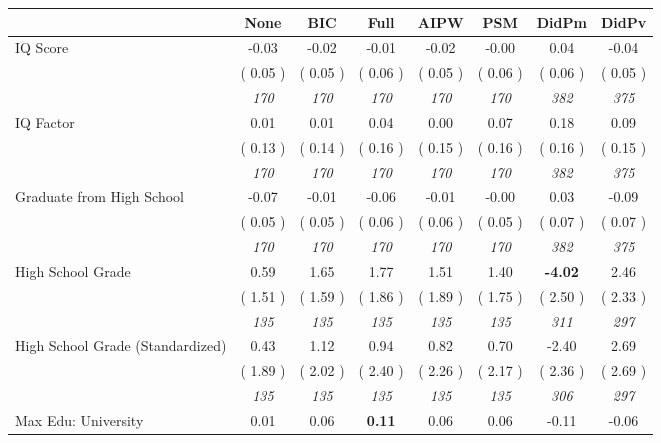 \begin{tabular}{l c c c c c c c}
\toprule
 & None & BIC & Full & AIPW & PSM & DidPm & DidPv \\
\midrule
IQ Score &     -0.03 &     -0.02 &     -0.01 &     -0.02 &     -0.00 &      0.04 &     -0.04 \\
& (     0.05 ) & (     0.05 ) & (     0.06 ) & (     0.05 ) & (     0.06 ) & (     0.06 ) & (     0.05 ) \\
& \textit{ 170 } & \textit{ 170 } & \textit{ 170 } & \textit{ 170 } & \textit{ 170 } & \textit{ 382 } & \textit{ 375 } \\
IQ Factor &      0.01 &      0.01 &      0.04 &      0.00 &      0.07 &      0.18 &      0.09 \\
& (     0.13 ) & (     0.14 ) & (     0.16 ) & (     0.15 ) & (     0.16 ) & (     0.16 ) & (     0.15 ) \\
& \textit{ 170 } & \textit{ 170 } & \textit{ 170 } & \textit{ 170 } & \textit{ 170 } & \textit{ 382 } & \textit{ 375 } \\
Graduate from High School &     -0.07 &     -0.01 &     -0.06 &     -0.01 &     -0.00 &      0.03 &     -0.09 \\
& (     0.05 ) & (     0.05 ) & (     0.06 ) & (     0.06 ) & (     0.05 ) & (     0.07 ) & (     0.07 ) \\
& \textit{ 170 } & \textit{ 170 } & \textit{ 170 } & \textit{ 170 } & \textit{ 170 } & \textit{ 382 } & \textit{ 375 } \\
High School Grade &      0.59 &      1.65 &      1.77 &      1.51 &      1.40 & \textbf{     -4.02 } &      2.46 \\
& (     1.51 ) & (     1.59 ) & (     1.86 ) & (     1.89 ) & (     1.75 ) & (     2.50 ) & (     2.33 ) \\
& \textit{ 135 } & \textit{ 135 } & \textit{ 135 } & \textit{ 135 } & \textit{ 135 } & \textit{ 311 } & \textit{ 297 } \\
High School Grade (Standardized) &      0.43 &      1.12 &      0.94 &      0.82 &      0.70 &     -2.40 &      2.69 \\
& (     1.89 ) & (     2.02 ) & (     2.40 ) & (     2.26 ) & (     2.17 ) & (     2.36 ) & (     2.69 ) \\
& \textit{ 135 } & \textit{ 135 } & \textit{ 135 } & \textit{ 135 } & \textit{ 135 } & \textit{ 306 } & \textit{ 297 } \\
Max Edu: University &      0.01 &      0.06 & \textbf{      0.11 } &      0.06 &      0.06 &     -0.11 &     -0.06 \\

\end{tabular}
